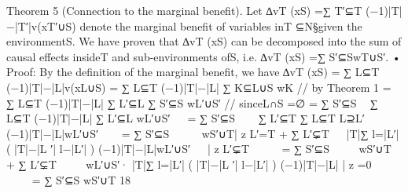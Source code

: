 Theorem 5 (Connection to the marginal beneﬁt). Let ∆vT (xS) =∑
T′⊆T (−1)|T|−|T′|v(xT′∪S) denote the marginal beneﬁt
of variables inT ⊆N\S given the environmentS. We have proven that ∆vT (xS) can be decomposed into the sum of causal
effects insideT and sub-environments ofS, i.e. ∆vT (xS) =∑
S′⊆SwT∪S′.
• Proof: By the deﬁnition of the marginal beneﬁt, we have
∆vT (xS) =
∑
L⊆T
(−1)|T|−|L|v(xL∪S)
=
∑
L⊆T
(−1)|T|−|L| ∑
K⊆L∪S
wK // by Theorem 1
=
∑
L⊆T
(−1)|T|−|L| ∑
L′⊆L
∑
S′⊆S
wL′∪S′ // sinceL∩S =∅
=
∑
S′⊆S

∑
L⊆T
(−1)|T|−|L| ∑
L′⊆L
wL′∪S′


=
∑
S′⊆S


∑
L′⊆T
∑
L⊆T
L⊇L′
(−1)|T|−|L|wL′∪S′


=
∑
S′⊆S


wS′∪T| {z }
L′=T
+
∑
L′⊊T


|T|∑
l=|L′|
(
|T|−|L ′|
l−|L′|
)
(−1)|T|−|L|wL′∪S′


| {z }
L′⊊T


=
∑
S′⊆S


wS′∪T +
∑
L′⊊T


wL′∪S′·
|T|∑
l=|L′|
(
|T|−|L ′|
l−|L′|
)
(−1)|T|−|L|
| {z }
=0




=
∑
S′⊆S
wS′∪T
18
